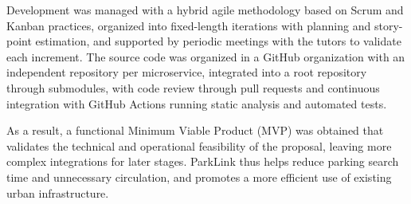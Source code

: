 Development was managed with a hybrid agile methodology based on Scrum and Kanban practices, organized into fixed-length iterations with planning and story-point estimation, and supported by periodic meetings with the tutors to validate each increment. The source code was organized in a GitHub organization with an independent repository per microservice, integrated into a root repository through submodules, with code review through pull requests and continuous integration with GitHub Actions running static analysis and automated tests.

As a result, a functional Minimum Viable Product (MVP) was obtained that validates the technical and operational feasibility of the proposal, leaving more complex integrations
 for later stages. ParkLink thus helps reduce parking search time and unnecessary circulation, and promotes a more efficient use of existing urban infrastructure.
